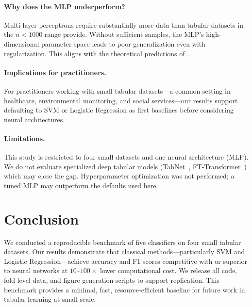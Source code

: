 \documentclass[10pt,twocolumn]{article}
\begin{document}
\paragraph{Why does the MLP underperform?}
Multi-layer perceptrons require substantially more data than tabular datasets in the 
$n < 1000$ range provide. Without sufficient samples, the MLP's high-dimensional 
parameter space leads to poor generalization even with regularization.
This aligns with the theoretical predictions of \citet{grinsztajn2022tree}.

\paragraph{Implications for practitioners.}
For practitioners working with small tabular datasets—a common setting in healthcare, 
environmental monitoring, and social services—our results support defaulting to 
SVM or Logistic Regression as first baselines before considering neural architectures.

\paragraph{Limitations.}
This study is restricted to four small datasets and one neural architecture (MLP). 
We do not evaluate specialized deep tabular models (TabNet~\citep{arik2021tabnet}, 
FT-Transformer~\citep{gorishniy2021revisiting}) which may close the gap.
Hyperparameter optimization was not performed; a tuned MLP may outperform the defaults used here.

\section{Conclusion}

We conducted a reproducible benchmark of five classifiers on four small tabular datasets. 
Our results demonstrate that classical methods—particularly SVM and Logistic Regression—achieve 
accuracy and F1 scores competitive with or superior to neural networks at $10\text{--}100\times$ 
lower computational cost.
We release all code, fold-level data, and figure generation scripts to support replication. 
This benchmark provides a minimal, fast, resource-efficient baseline for future 
work in tabular learning at small scale.



\end{document}
